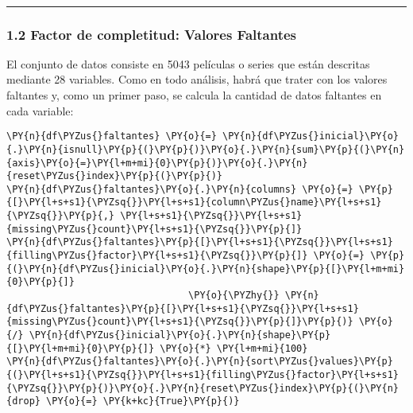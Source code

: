     \begin{center}
    \end{center}
    { \hspace*{\fill} \\}
    
    \begin{center}\rule{0.5\linewidth}{0.5pt}\end{center}

\hypertarget{factor-de-completitud-valores-faltantes}{%
\subsubsection{1.2 Factor de completitud: Valores
Faltantes}\label{factor-de-completitud-valores-faltantes}}

El conjunto de datos consiste en 5043 películas o series que están
descritas mediante 28 variables. Como en todo análisis, habrá que trater
con los valores faltantes y, como un primer paso, se calcula la cantidad
de datos faltantes en cada variable:

    \begin{tcolorbox}[breakable, size=fbox, boxrule=1pt, pad at break*=1mm,colback=cellbackground, colframe=cellborder]
\begin{Verbatim}[commandchars=\\\{\}]
\PY{n}{df\PYZus{}faltantes} \PY{o}{=} \PY{n}{df\PYZus{}inicial}\PY{o}{.}\PY{n}{isnull}\PY{p}{(}\PY{p}{)}\PY{o}{.}\PY{n}{sum}\PY{p}{(}\PY{n}{axis}\PY{o}{=}\PY{l+m+mi}{0}\PY{p}{)}\PY{o}{.}\PY{n}{reset\PYZus{}index}\PY{p}{(}\PY{p}{)}
\PY{n}{df\PYZus{}faltantes}\PY{o}{.}\PY{n}{columns} \PY{o}{=} \PY{p}{[}\PY{l+s+s1}{\PYZsq{}}\PY{l+s+s1}{column\PYZus{}name}\PY{l+s+s1}{\PYZsq{}}\PY{p}{,} \PY{l+s+s1}{\PYZsq{}}\PY{l+s+s1}{missing\PYZus{}count}\PY{l+s+s1}{\PYZsq{}}\PY{p}{]}
\PY{n}{df\PYZus{}faltantes}\PY{p}{[}\PY{l+s+s1}{\PYZsq{}}\PY{l+s+s1}{filling\PYZus{}factor}\PY{l+s+s1}{\PYZsq{}}\PY{p}{]} \PY{o}{=} \PY{p}{(}\PY{n}{df\PYZus{}inicial}\PY{o}{.}\PY{n}{shape}\PY{p}{[}\PY{l+m+mi}{0}\PY{p}{]} 
                                \PY{o}{\PYZhy{}} \PY{n}{df\PYZus{}faltantes}\PY{p}{[}\PY{l+s+s1}{\PYZsq{}}\PY{l+s+s1}{missing\PYZus{}count}\PY{l+s+s1}{\PYZsq{}}\PY{p}{]}\PY{p}{)} \PY{o}{/} \PY{n}{df\PYZus{}inicial}\PY{o}{.}\PY{n}{shape}\PY{p}{[}\PY{l+m+mi}{0}\PY{p}{]} \PY{o}{*} \PY{l+m+mi}{100}
\PY{n}{df\PYZus{}faltantes}\PY{o}{.}\PY{n}{sort\PYZus{}values}\PY{p}{(}\PY{l+s+s1}{\PYZsq{}}\PY{l+s+s1}{filling\PYZus{}factor}\PY{l+s+s1}{\PYZsq{}}\PY{p}{)}\PY{o}{.}\PY{n}{reset\PYZus{}index}\PY{p}{(}\PY{n}{drop} \PY{o}{=} \PY{k+kc}{True}\PY{p}{)}
\end{Verbatim}
\end{tcolorbox}

